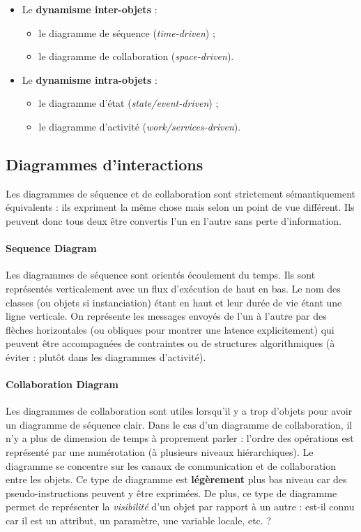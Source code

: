 \documentclass{article}
\begin{document}
	\begin{itemize}
		\item Le \textbf{dynamisme inter-objets} :
			\begin{itemize}
				\item le diagramme de séquence (\textit{time-driven}) ;
				\item le diagramme de collaboration (\textit{space-driven}).
			\end{itemize}
		\item Le \textbf{dynamisme intra-objets} :
			\begin{itemize}
				\item le diagramme d'état (\textit{state/event-driven}) ;
				\item le diagramme d'activité (\textit{work/services-driven}).
			\end{itemize}
	\end{itemize}

	\subsection{Diagrammes d'interactions}
		Les diagrammes de séquence et de collaboration sont strictement sémantiquement équivalents : ils expriment la même chose mais selon un point de vue différent. Ils peuvent donc
		tous deux être convertis l'un en l'autre sans perte d'information.

		\paragraph{Sequence Diagram} Les diagrammes de séquence sont orientés écoulement du temps. Ils sont représentés verticalement avec un flux d'exécution de haut en bas. Le nom
		des classes (ou objets si instanciation) étant en haut et leur durée de vie étant une ligne verticale. On représente les messages envoyés de l'un à l'autre par des flèches horizontales
		(ou obliques pour montrer une latence explicitement) qui peuvent être accompagnées de contraintes ou de structures algorithmiques (à éviter : plutôt dans les diagrammes d'activité).

		\paragraph{Collaboration Diagram} Les diagrammes de collaboration sont utiles lorsqu'il y a trop d'objets pour avoir un diagramme de séquence clair. Dans le cas d'un diagramme de
		collaboration, il n'y a plus de dimension de temps à proprement parler : l'ordre des opérations est représenté par une numérotation (à plusieurs niveaux hiérarchiques). Le diagramme se
		concentre sur les canaux de communication et de collaboration entre les objets. Ce type de diagramme est \textbf{légèrement} plus bas niveau car des pseudo-instructions peuvent y être
		exprimées. De plus, ce type de diagramme permet de représenter la \textit{visibilité} d'un objet par rapport à un autre : est-il connu car il est un attribut, un paramètre, une variable
		locale, etc. ?
\end{document}
